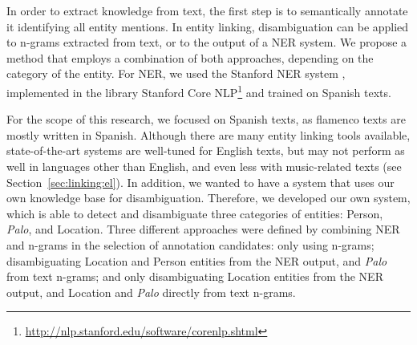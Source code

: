 In order to extract knowledge from text, the first step is to semantically annotate it identifying all entity mentions. %
In entity linking, disambiguation can be applied to n-grams extracted from text, or to the output of a NER system. We propose a method that employs a combination of both approaches, depending on the category of the entity. For NER, we used the Stanford NER system \citep{Finkel2005}, implemented in the library Stanford Core NLP\footnote{\url{http://nlp.stanford.edu/software/corenlp.shtml}} and trained on Spanish texts. %

For the scope of this research, we focused on Spanish texts, as flamenco texts are mostly written in Spanish. Although there are many entity linking tools available, state-of-the-art systems are well-tuned for English texts, but may not perform as well in languages other than English, and even less with music-related texts (see Section~\ref{sec:linking:el}). In addition, we wanted to have a system that uses our own knowledge base for disambiguation. Therefore, we developed our own system, which is able to detect and disambiguate three categories of entities: Person, \textit{Palo}, and Location. Three different approaches were defined by combining NER and n-grams in the selection of annotation candidates: only using n-grams; disambiguating Location and Person entities from the NER output, and \textit{Palo} from text n-grams; and only disambiguating Location entities from the NER output, and Location and \textit{Palo} directly from text n-grams.

